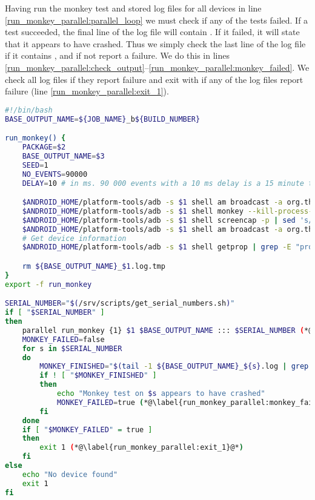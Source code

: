 Having run the monkey test and stored log files for all devices in line \ref{run_monkey_parallel:parallel_loop} we must check if any of the tests failed. If a test succeeded, the final line of the log file will contain . If it failed, it will state that it appears to have crashed. Thus we simply check the last line of the log file if it contains , and if not report a failure. We do this in lines \ref{run_monkey_parallel:check_output}--\ref{run_monkey_parallel:monkey_failed}. We check all log files if they report failure and exit with  if any of the log files report failure (line \ref{run_monkey_parallel:exit_1}).

\begin{lstlisting}[float=tbp,language=bash,caption=Bash script that runs monkey tests on all connected devices in parallel,label=lst:run_monkey_parallel]
#!/bin/bash
BASE_OUTPUT_NAME=${JOB_NAME}_b${BUILD_NUMBER}

run_monkey() {
    PACKAGE=$2
    BASE_OUTPUT_NAME=$3
    SEED=1
    NO_EVENTS=90000
    DELAY=10 # in ms. 90 000 events with a 10 ms delay is a 15 minute test.

    $ANDROID_HOME/platform-tools/adb -s $1 shell am broadcast -a org.thisisafactory.simiasque.SET_OVERLAY --ez enable true(*@\label{run_monkey_parallel:go_away_monkey_true}@*)
    $ANDROID_HOME/platform-tools/adb -s $1 shell monkey --kill-process-after-error -v -v -s $SEED --throttle $DELAY -p $PACKAGE $NO_EVENTS > ${BASE_OUTPUT_NAME}_$1.log.tmp (*@\label{run_monkey_parallel:run_monkey_test}@*)
    $ANDROID_HOME/platform-tools/adb -s $1 shell screencap -p | sed 's/\r$//' > ${BASE_OUTPUT_NAME}_$1.png (*@\label{run_monkey_parallel:screenshot}@*)
    $ANDROID_HOME/platform-tools/adb -s $1 shell am broadcast -a org.thisisafactory.simiasque.SET_OVERLAY --ez enable false(*@\label{run_monkey_parallel:go_away_monkey_false}@*)
    # Get device information
    $ANDROID_HOME/platform-tools/adb -s $1 shell getprop | grep -E "product|sdk|serial" | grep -v ro.boot | cat - ${BASE_OUTPUT_NAME}_$1.log.tmp > ${BASE_OUTPUT_NAME}_$1.log (*@\label{run_monkey_parallel:device_info}@*)

    rm ${BASE_OUTPUT_NAME}_$1.log.tmp
}
export -f run_monkey

SERIAL_NUMBER="$(/srv/scripts/get_serial_numbers.sh)"
if [ "$SERIAL_NUMBER" ]
then
    parallel run_monkey {1} $1 $BASE_OUTPUT_NAME ::: $SERIAL_NUMBER (*@\label{run_monkey_parallel:parallel_loop}@*)
    MONKEY_FAILED=false
    for s in $SERIAL_NUMBER
    do
        MONKEY_FINISHED="$(tail -1 ${BASE_OUTPUT_NAME}_${s}.log | grep -i "monkey finished")" (*@\label{run_monkey_parallel:check_output}@*)
        if ! [ "$MONKEY_FINISHED" ]
        then
            echo "Monkey test on $s appears to have crashed"
            MONKEY_FAILED=true (*@\label{run_monkey_parallel:monkey_failed}@*)
        fi
    done
    if [ "$MONKEY_FAILED" = true ]
    then
        exit 1 (*@\label{run_monkey_parallel:exit_1}@*)
    fi
else
    echo "No device found"
    exit 1
fi
\end{lstlisting}


